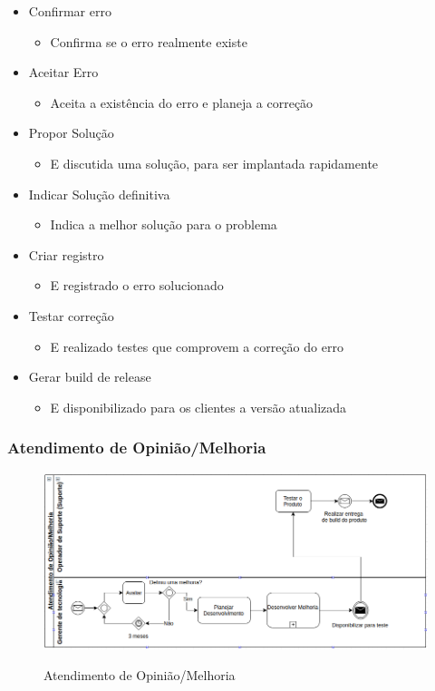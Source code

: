 \begin{itemize}[noitemsep]
	\item Confirmar erro
		\begin{itemize}
			\item Confirma se o erro realmente existe
		\end{itemize}
	\item Aceitar Erro
		\begin{itemize}
			\item Aceita a existência do erro e planeja a correção
		\end{itemize}
	\item Propor Solução
		\begin{itemize}
			\item E discutida uma solução, para ser implantada rapidamente
		\end{itemize}
	\item Indicar Solução definitiva
		\begin{itemize}
			\item Indica a melhor solução para o problema
		\end{itemize}
	\item Criar registro
		\begin{itemize}
			\item E registrado o erro solucionado
		\end{itemize}
	\item Testar correção
		\begin{itemize}
			\item E realizado testes que comprovem a correção do erro
		\end{itemize}
	\item Gerar build de release
		\begin{itemize}
			\item E disponibilizado para os clientes a versão atualizada
		\end{itemize}
\end{itemize}
\clearpage
\subsubsection{Atendimento de Opinião/Melhoria}

\begin{figure}[!h]
\caption{Atendimento de Opinião/Melhoria}
\centering %
\includegraphics[width=15cm]{as-is/04_atendimento_de_melhoria.png}
\label{figura:atendimento_de_melhoria_as_is}
\end{figure}

